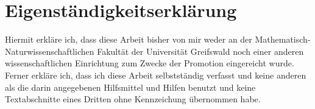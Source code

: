 \thispagestyle{empty}
\section*{%
    Eigenständigkeitserklärung}%
    
    Hiermit erkläre ich, dass diese Arbeit bisher von mir weder an der Ma\-the\-ma\-tisch-Naturwissenschaftlichen Fakultät der Universität Greifswald noch einer anderen wissenschaftlichen Einrichtung zum Zwecke der Promotion eingereicht wurde. Ferner erkläre ich, dass ich diese Arbeit selbstständig verfasst und keine anderen als die darin angegebenen Hilfsmittel und Hilfen benutzt und keine Textabschnitte eines Dritten ohne Kennzeichung übernommen habe.

